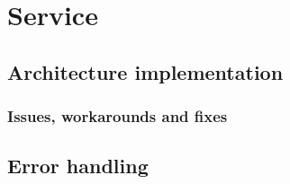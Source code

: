\section{Service}
\label{Implementation_Service}

\subsection[Architecture]{Architecture implementation}
\label{Implementation_Service_Architecture}

\subsubsection{Issues, workarounds and fixes}
\label{Implementation_Service_Architecture_Issues}

\subsection{Error handling}
\label{Implementation_Service_Error}